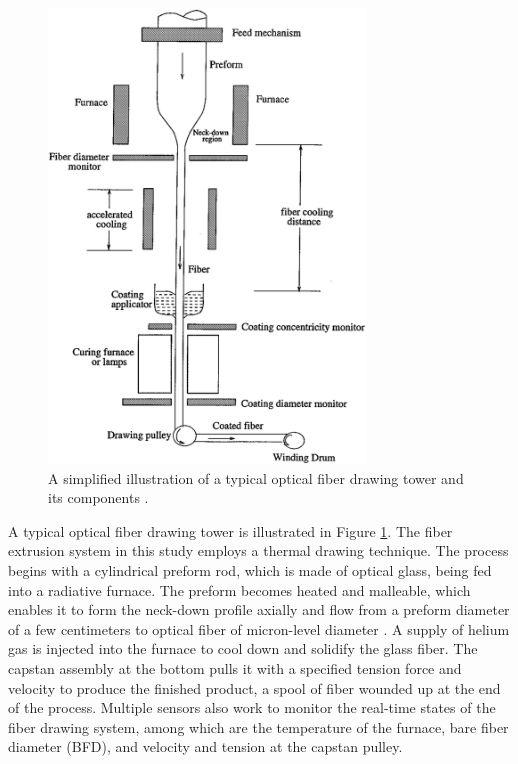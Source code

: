 \begin{figure}[ht!]
    \centering
    \includegraphics[width=0.75\textwidth]{figures/neckdown.png}
    \caption{A simplified illustration of a typical optical fiber drawing tower and its components \cite{neckdown}.}
    \label{fig:neckdown}
\end{figure}

A typical optical fiber drawing tower is illustrated in Figure \ref{fig:neckdown}. The fiber extrusion system in this study employs a thermal drawing technique. The process begins with a cylindrical preform rod, which is made of optical glass, being fed into a radiative furnace. The preform becomes heated and malleable, which enables it to form the neck-down profile axially and flow from a preform diameter of a few centimeters to optical fiber of micron-level diameter \cite{neckdown}. A supply of helium gas is injected into the furnace to cool down and solidify the glass fiber. The capstan assembly at the bottom pulls it with a specified tension force and velocity to produce the finished product, a spool of fiber wounded up at the end of the process. Multiple sensors also work to monitor the real-time states of the fiber drawing system, among which are the temperature of the furnace, bare fiber diameter (BFD), and velocity and tension at the capstan pulley. 

